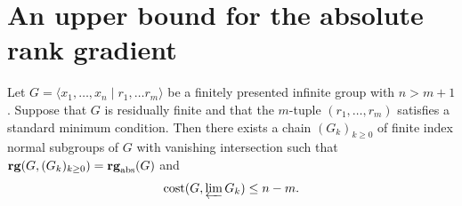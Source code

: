 \section{An upper bound for the absolute rank gradient}

\begin{thm}\label{thm: rank gradient}
	Let $G=\langle x_1,\ldots, x_n\mid r_1,\ldots r_m\rangle$ be a finitely presented infinite group with $n>m+1$. Suppose that $G$ is residually finite and that the $m$-tuple $(r_1,\ldots,r_m)$ satisfies a standard minimum condition. Then there exists a chain $(G_k)_{k\ge 0}$ of finite index normal subgroups of $G$ with vanishing intersection such that $\mathbf{rg}(G,(G_k)_{k\ge 0})=\mathbf{rg}_{\mathrm{abs}}(G)$ and
	\[
	\mathrm{cost}(G,\varprojlim G_k)\le n-m.
	\]
\end{thm}